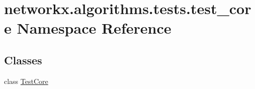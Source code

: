 \hypertarget{namespacenetworkx_1_1algorithms_1_1tests_1_1test__core}{}\section{networkx.\+algorithms.\+tests.\+test\+\_\+core Namespace Reference}
\label{namespacenetworkx_1_1algorithms_1_1tests_1_1test__core}
\subsection*{Classes}
\begin{DoxyCompactItemize}
\item 
class \hyperlink{classnetworkx_1_1algorithms_1_1tests_1_1test__core_1_1TestCore}{Test\+Core}
\end{DoxyCompactItemize}
